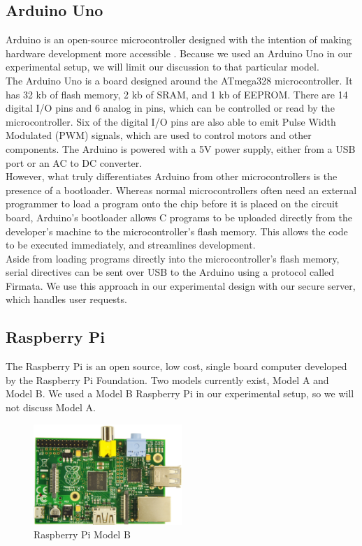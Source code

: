 \documentclass[10pt]{article}
\begin{document}
\begin{multicols}{2}
\subsection{Arduino Uno}
Arduino is an open-source microcontroller designed with the intention of making hardware development more accessible \cite{arduinoschematic}. Because we used an Arduino Uno in our experimental setup, we will limit our discussion to that particular model. \\

The Arduino Uno \cite{arduinouno} is a board designed around the ATmega328 microcontroller. It has 32 kb of flash memory, 2 kb of SRAM, and 1 kb of EEPROM. There are 14 digital I/O pins and 6 analog in pins, which can be controlled or read by the microcontroller. Six of the digital I/O pins are also able to emit Pulse Width Modulated (PWM) signals, which are used to control motors and other components. The Arduino is powered with a 5V power supply, either from a USB port or an AC to DC converter. \\

However, what truly differentiates Arduino from other microcontrollers is the presence of a bootloader. Whereas normal microcontrollers often need an external programmer to load a program onto the chip before it is placed on the circuit board, Arduino's bootloader allows C programs to be uploaded directly from the developer's machine to the microcontroller's flash memory. This allows the code to be executed immediately, and streamlines development. \\

Aside from loading programs directly into the microcontroller's flash memory, serial directives can be sent over USB to the Arduino using a protocol called Firmata. We use this approach in our experimental design with our secure server, which handles user requests. \\

\subsection{Raspberry Pi}
The Raspberry Pi \cite{raspberrypi} is an open source, low cost, single board computer developed by the Raspberry Pi Foundation. Two models currently exist, Model A and Model B. We used a Model B Raspberry Pi in our experimental setup, so we will not discuss Model A. \\

\begin{figure}[H]
\centering
\includegraphics[width=0.5\textwidth]{raspberrypi.png}
\caption{Raspberry Pi Model B}
\end{figure}


\end{multicols}
\end{document}
